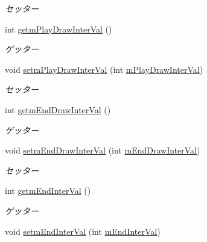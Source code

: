 \begin{DoxyCompactItemize}
\begin{DoxyCompactList}\small\item\em セッター \end{DoxyCompactList}\item 
int \hyperlink{classjp_1_1gr_1_1java__conf_1_1yuta__yoshinaga_1_1reversi_1_1model_1_1_reversi_setting_a1269bfcbdc192e1f1429407d40cc6e67}{getm\+Play\+Draw\+Inter\+Val} ()
\begin{DoxyCompactList}\small\item\em ゲッター \end{DoxyCompactList}\item 
void \hyperlink{classjp_1_1gr_1_1java__conf_1_1yuta__yoshinaga_1_1reversi_1_1model_1_1_reversi_setting_aae2b022804d0828d000bdb09d247c82d}{setm\+Play\+Draw\+Inter\+Val} (int \hyperlink{classjp_1_1gr_1_1java__conf_1_1yuta__yoshinaga_1_1reversi_1_1model_1_1_reversi_setting_af382853d43c1936838d88df5115ab011}{m\+Play\+Draw\+Inter\+Val})
\begin{DoxyCompactList}\small\item\em セッター \end{DoxyCompactList}\item 
int \hyperlink{classjp_1_1gr_1_1java__conf_1_1yuta__yoshinaga_1_1reversi_1_1model_1_1_reversi_setting_af0024a8f8f725a80ddbaa9cac751e555}{getm\+End\+Draw\+Inter\+Val} ()
\begin{DoxyCompactList}\small\item\em ゲッター \end{DoxyCompactList}\item 
void \hyperlink{classjp_1_1gr_1_1java__conf_1_1yuta__yoshinaga_1_1reversi_1_1model_1_1_reversi_setting_a38bc7a7d71c43a230fd545ef8e9be144}{setm\+End\+Draw\+Inter\+Val} (int \hyperlink{classjp_1_1gr_1_1java__conf_1_1yuta__yoshinaga_1_1reversi_1_1model_1_1_reversi_setting_a58279a54b4df5fc7fa4e58bfdcaf09c3}{m\+End\+Draw\+Inter\+Val})
\begin{DoxyCompactList}\small\item\em セッター \end{DoxyCompactList}\item 
int \hyperlink{classjp_1_1gr_1_1java__conf_1_1yuta__yoshinaga_1_1reversi_1_1model_1_1_reversi_setting_a35f2248862e0e35bc4eaec74b39a45a0}{getm\+End\+Inter\+Val} ()
\begin{DoxyCompactList}\small\item\em ゲッター \end{DoxyCompactList}\item 
void \hyperlink{classjp_1_1gr_1_1java__conf_1_1yuta__yoshinaga_1_1reversi_1_1model_1_1_reversi_setting_a1782a1a23456afe4cc15e60f697d2747}{setm\+End\+Inter\+Val} (int \hyperlink{classjp_1_1gr_1_1java__conf_1_1yuta__yoshinaga_1_1reversi_1_1model_1_1_reversi_setting_ac0860de019e3d73654407da6823d6c53}{m\+End\+Inter\+Val})

\end{DoxyCompactItemize}

